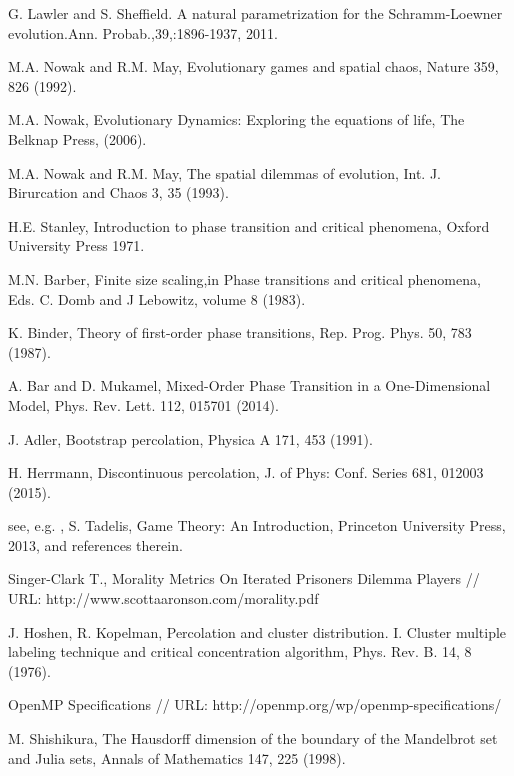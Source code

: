 \documentclass[12pt,a4paper]{article}
\begin{document}
\begin{thebibliography}{99}
 	G. Lawler and S. Sheffield. A natural parametrization for the Schramm-Loewner evolution.Ann. Probab.,39,:1896-1937, 2011.
 	
 	  M.A. Nowak and R.M. May, Evolutionary games and spatial chaos, Nature 359, 826 (1992).
 	
 	  M.A. Nowak, Evolutionary Dynamics:  Exploring the equations of life, The Belknap Press, (2006).
 	
 	  M.A. Nowak and R.M. May, The spatial dilemmas of evolution, Int. J. Birurcation and Chaos 3, 35 (1993).
 	
 	  H.E. Stanley, Introduction to phase transition and critical phenomena, Oxford University Press 1971.
 	
 	  M.N. Barber, Finite size scaling,in Phase transitions and critical phenomena, Eds. C. Domb and J Lebowitz, volume 8 (1983).
 	
 	  K. Binder, Theory of first-order phase transitions, Rep. Prog. Phys. 50, 783 (1987).
 	
 	  A. Bar and D. Mukamel, Mixed-Order Phase Transition in a One-Dimensional Model, Phys. Rev. Lett. 112, 015701 (2014).
 	
 	  J. Adler, Bootstrap percolation, Physica A 171, 453 (1991).
 	
 	  H. Herrmann, Discontinuous percolation, J. of Phys:  Conf. Series 681, 012003 (2015).
 	
 	  see, e.g. , S. Tadelis, Game Theory:  An Introduction, Princeton University Press, 2013, and references therein.
 	
 	 Singer-Clark T., Morality Metrics On Iterated Prisoners Dilemma Players // URL: http://www.scottaaronson.com/morality.pdf
 	
 	  J.  Hoshen,  R.  Kopelman, Percolation  and  cluster  distribution.  I.  Cluster  multiple  labeling  technique  and critical concentration algorithm, Phys. Rev. B. 14, 8 (1976).
 	
 	  OpenMP Specifications // URL: http://openmp.org/wp/openmp-specifications/
 	
 	  M.  Shishikura, The  Hausdorff  dimension  of  the  boundary  of  the  Mandelbrot  set  and  Julia  sets,  Annals  of Mathematics 147, 225 (1998).
 	
	\end{thebibliography}
\end{document}
